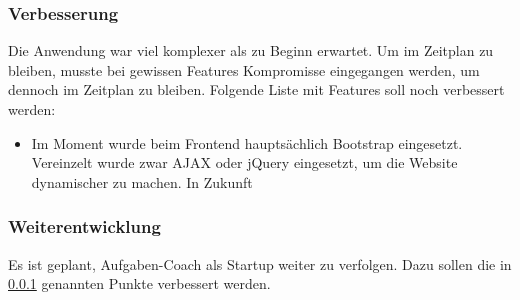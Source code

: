 \subsubsection{Verbesserung}
\label{verbesserung}
Die Anwendung war viel komplexer als zu Beginn erwartet. Um im Zeitplan zu bleiben, musste bei gewissen Features  Kompromisse eingegangen werden, um dennoch im Zeitplan zu bleiben. Folgende Liste mit Features soll noch verbessert werden:

\begin{itemize}
	\item Im Moment wurde beim Frontend hauptsächlich Bootstrap eingesetzt. Vereinzelt wurde zwar AJAX oder jQuery eingesetzt, um die Website dynamischer zu machen. In Zukunft 
\end{itemize}



\subsubsection{Weiterentwicklung}
Es ist geplant, Aufgaben-Coach als Startup weiter zu verfolgen. Dazu sollen die in \ref{verbesserung} genannten Punkte verbessert werden.

\newpage
